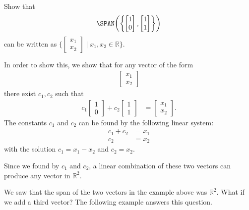 \begin{example} \label{ex:span:2}


Show that 
%
\begin{align*}
\SPAN\biggl( \biggl\{\begin{bmatrix}
1 \\ 0
\end{bmatrix}, \begin{bmatrix}
1 \\ 1
\end{bmatrix} \biggr\} \biggr)
\end{align*}
can be written as $\{ \begin{bmatrix}
x_1 \\ x_2 
\end{bmatrix} \; | \; x_1,x_2 \in \mathbb{R} \}$.  

\solution

In order to show this, we show that for any vector of the form
\begin{align*}
\begin{bmatrix}
x_1 \\ x_2 
\end{bmatrix}
\end{align*}  there exist $c_1, c_2$ such that 
%
\begin{align*}
c_1 \begin{bmatrix}
1 \\ 0 
\end{bmatrix} + c_2 \begin{bmatrix}
1 \\ 1 
\end{bmatrix} & = \begin{bmatrix}
x_1 \\ x_2
\end{bmatrix}.
\end{align*}
The constants $c_1$ and $c_2$ can be found by the following linear system:
%
\begin{align*}
c_1 + c_2 & = x_1 \\
c_2 & = x_2 
\end{align*}
with the solution $c_1 = x_1-x_2$ and $c_2=x_2$.  

Since we found by $c_1$ and $c_2$, a linear combination of these two vectors can produce any vector in $\mathbb{R}^2$.  
\end{example}

We saw that the span of the two vectors in the example above was $\mathbb{R}^2$.  What if we add a third vector?  The following example answers this question.


